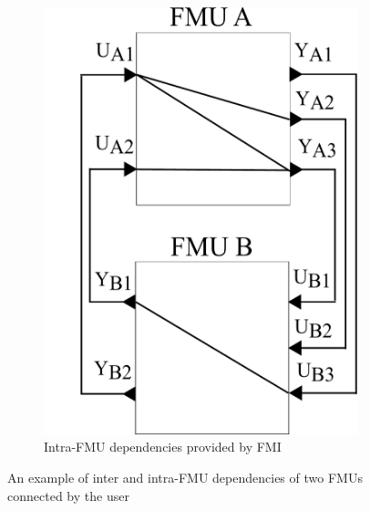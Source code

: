\begin{figure}[htb]
\begin{subfigure}{.5\textwidth}
  \includegraphics[scale=0.2]{figures/Two_Models}
  \caption{Intra-FMU dependencies provided by FMI}
  \label{fig:2mdlsintra}
\end{subfigure}
\caption{An example of inter and intra-FMU dependencies of two FMUs connected by the user}
\label{fig:2mdls}
\end{figure}


